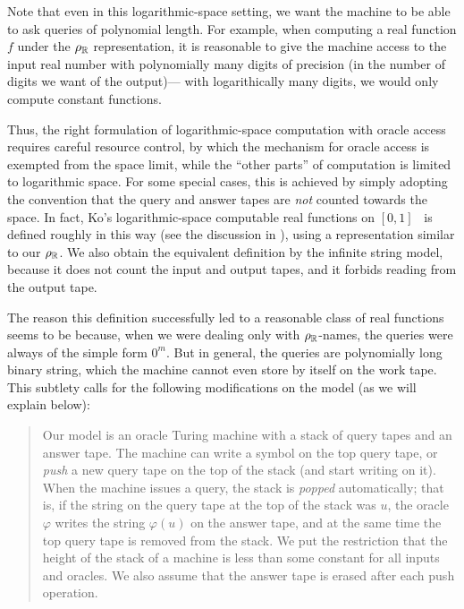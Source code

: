 \documentclass[a4paper,UKenglish]{lipics}
\begin{document}
Note that even in this logarithmic-space setting, 
we want the machine to be able to ask queries of polynomial length. 
For example, when computing a real function $f$ under the $\rho _\mathbb R$ representation, 
it is reasonable to give the machine access to 
the input real number with polynomially many digits of precision 
(in the number of digits we want of the output)---%
with logarithically many digits, 
we would only compute constant functions. 

Thus, the right formulation of logarithmic-space computation with oracle access 
requires careful resource control, by which 
the mechanism for oracle access is exempted from the space limit, 
while the ``other parts'' of computation is limited to logarithmic space. 
For some special cases, 
this is achieved by simply adopting the convention that 
the query and answer tapes 
are \emph{not} counted towards the space. 
In fact, Ko's logarithmic-space computable real functions on $[0, 1]$~%
\cite[Chapter~4]{ko1991complexity} is defined roughly in this way
(see the discussion in \cite[pp.~121--122]{ko1991complexity}), 
using a representation similar to our $\rho _\mathbb R$. 
We also obtain the equivalent definition 
by the infinite string model, 
because it does not count the input and output tapes, 
and it forbids reading from the output tape. 

The reason this definition successfully led to a reasonable class of real functions
seems to be because, 
when we were dealing only with $\rho _\mathbb R$-names, 
the queries were always of the simple form $0 ^m$. 
But in general, 
the queries are polynomially long binary string, 
which the machine cannot even store by itself on the work tape. 
This subtlety calls for the following modifications on the model
(as we will explain below): 

\begin{quote}
Our model is an oracle Turing machine 
with a stack of query tapes and an answer tape.
The machine can write a symbol on the top query tape, or 
\emph{push} a new query tape on the top of the stack (and start writing on it).
When the machine issues a query, the stack is \emph{popped} automatically; 
that is, 
if the string on the query tape at the top of the stack was $u$, 
the oracle $\varphi$ writes the string $\varphi (u)$ on the answer tape, 
and at the same time the top query tape is removed from the stack. 
We put the restriction that the height of the stack of a machine is less than 
some constant for all inputs and oracles.
We also assume that 
the answer tape is erased after each push operation.
\end{quote}
\end{document}
